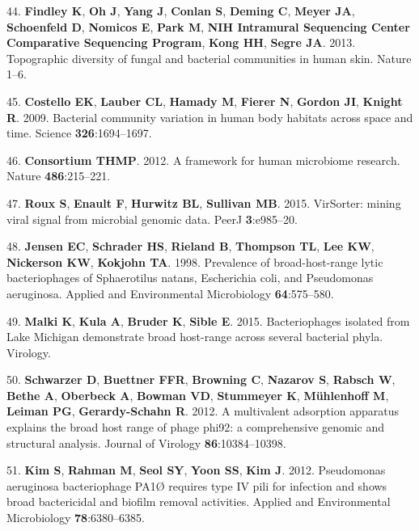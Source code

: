 \documentclass[12pt,]{article}
\begin{document}
\hypertarget{ref-Findley:2013jf}{}
44. \textbf{Findley K}, \textbf{Oh J}, \textbf{Yang J}, \textbf{Conlan
S}, \textbf{Deming C}, \textbf{Meyer JA}, \textbf{Schoenfeld D},
\textbf{Nomicos E}, \textbf{Park M}, \textbf{NIH Intramural Sequencing
Center Comparative Sequencing Program}, \textbf{Kong HH}, \textbf{Segre
JA}. 2013. Topographic diversity of fungal and bacterial communities in
human skin. Nature 1--6.

\hypertarget{ref-Costello:2009im}{}
45. \textbf{Costello EK}, \textbf{Lauber CL}, \textbf{Hamady M},
\textbf{Fierer N}, \textbf{Gordon JI}, \textbf{Knight R}. 2009.
Bacterial community variation in human body habitats across space and
time. Science \textbf{326}:1694--1697.

\hypertarget{ref-Consortium:2012iz}{}
46. \textbf{Consortium THMP}. 2012. A framework for human microbiome
research. Nature \textbf{486}:215--221.

\hypertarget{ref-Roux:2015dh}{}
47. \textbf{Roux S}, \textbf{Enault F}, \textbf{Hurwitz BL},
\textbf{Sullivan MB}. 2015. VirSorter: mining viral signal from
microbial genomic data. PeerJ \textbf{3}:e985--20.

\hypertarget{ref-Jensen:1998vh}{}
48. \textbf{Jensen EC}, \textbf{Schrader HS}, \textbf{Rieland B},
\textbf{Thompson TL}, \textbf{Lee KW}, \textbf{Nickerson KW},
\textbf{Kokjohn TA}. 1998. Prevalence of broad-host-range lytic
bacteriophages of Sphaerotilus natans, Escherichia coli, and Pseudomonas
aeruginosa. Applied and Environmental Microbiology \textbf{64}:575--580.

\hypertarget{ref-Malki:2015tm}{}
49. \textbf{Malki K}, \textbf{Kula A}, \textbf{Bruder K}, \textbf{Sible
E}. 2015. Bacteriophages isolated from Lake Michigan demonstrate broad
host-range across several bacterial phyla. Virology.

\hypertarget{ref-Schwarzer:2012ez}{}
50. \textbf{Schwarzer D}, \textbf{Buettner FFR}, \textbf{Browning C},
\textbf{Nazarov S}, \textbf{Rabsch W}, \textbf{Bethe A},
\textbf{Oberbeck A}, \textbf{Bowman VD}, \textbf{Stummeyer K},
\textbf{Mühlenhoff M}, \textbf{Leiman PG}, \textbf{Gerardy-Schahn R}.
2012. A multivalent adsorption apparatus explains the broad host range
of phage phi92: a comprehensive genomic and structural analysis. Journal
of Virology \textbf{86}:10384--10398.

\hypertarget{ref-Kim:2012dh}{}
51. \textbf{Kim S}, \textbf{Rahman M}, \textbf{Seol SY}, \textbf{Yoon
SS}, \textbf{Kim J}. 2012. Pseudomonas aeruginosa bacteriophage PA1Ø
requires type IV pili for infection and shows broad bactericidal and
biofilm removal activities. Applied and Environmental Microbiology
\textbf{78}:6380--6385.
\end{document}
